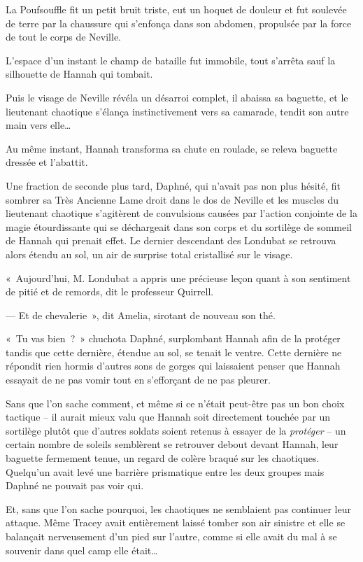 La Poufsouffle fit un petit bruit triste, eut un hoquet de douleur et fut soulevée de terre par la chaussure qui s'enfonça dans son abdomen, propulsée par la force de tout le corps de Neville.

L'espace d'un instant le champ de bataille fut immobile, tout s'arrêta sauf la silhouette de Hannah qui tombait.

Puis le visage de Neville révéla un désarroi complet, il abaissa sa baguette, et le lieutenant chaotique s'élança instinctivement vers sa camarade, tendit son autre main vers elle…

Au même instant, Hannah transforma sa chute en roulade, se releva baguette dressée et l'abattit.

Une fraction de seconde plus tard, Daphné, qui n'avait pas non plus hésité, fit sombrer sa Très Ancienne Lame droit dans le dos de Neville et les muscles du lieutenant chaotique s'agitèrent de convulsions causées par l'action conjointe de la magie étourdissante qui se déchargeait dans son corps et du sortilège de sommeil de Hannah qui prenait effet.
Le dernier descendant des Londubat se retrouva alors étendu au sol, un air de surprise total cristallisé sur le visage.

\later

«~Aujourd'hui, M. Londubat a appris une précieuse leçon quant à son sentiment de pitié et de remords, dit le professeur Quirrell.

--- Et de chevalerie~», dit Amelia, sirotant de nouveau son thé.

\later

«~Tu vas bien~?~»
chuchota Daphné, surplombant Hannah afin de la protéger tandis que cette dernière, étendue au sol, se tenait le ventre.
Cette dernière ne répondit rien hormis d'autres sons de gorges qui laissaient penser que Hannah essayait de ne pas vomir tout en s'efforçant de ne pas pleurer.

Sans que l'on sache comment, et même si ce n'était peut-être pas un bon choix tactique -- il aurait mieux valu que Hannah soit directement touchée par un sortilège plutôt que d'autres soldats soient retenus à essayer de la \emph{protéger} -- un certain nombre de soleils semblèrent se retrouver debout devant Hannah, leur baguette fermement tenue, un regard de colère braqué sur les chaotiques.
Quelqu'un avait levé une barrière prismatique entre les deux groupes mais Daphné ne pouvait pas voir qui.

Et, sans que l'on sache pourquoi, les chaotiques ne semblaient pas continuer leur attaque.
Même Tracey avait entièrement laissé tomber son air sinistre et elle se balançait nerveusement d'un pied sur l'autre, comme si elle avait du mal à se souvenir dans quel camp elle était…

